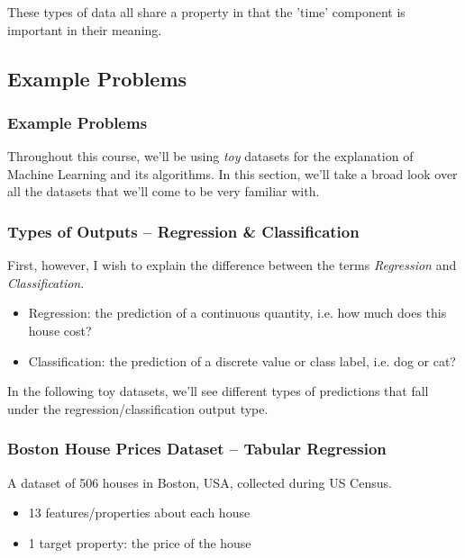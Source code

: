 \documentclass[10pt]{beamer}
\begin{document}
These types of data all share a property in that the 'time' component is important in
their meaning.  

\subsection*{Example Problems}
\label{sec:orgb839ebc}

\subsubsection*{Example Problems}
\label{sec:orgb19abbb}

Throughout this course, we'll be using \emph{toy} datasets for the explanation of Machine
Learning and its algorithms. In this section, we'll take a broad look over all the
datasets that we'll come to be very familiar with.

\subsubsection*{Types of Outputs -- Regression \& Classification}
\label{sec:orgf435fc7}

First, however, I wish to explain the difference between the terms \emph{Regression} and
\emph{Classification}.

\begin{itemize}
\item Regression: the prediction of a continuous quantity, i.e. how much does this house cost?
\item Classification: the prediction of a discrete value or class label, i.e. dog or cat?
\end{itemize}

In the following toy datasets, we'll see different types of predictions that fall
under the regression/classification output type.

\subsubsection*{Boston House Prices Dataset -- Tabular Regression}
\label{sec:orge482d0f}

A dataset of 506 houses in Boston, USA, collected during US Census.

\begin{itemize}
\item 13 features/properties about each house
\item 1 target property: the price of the house
\end{itemize}
\end{document}
